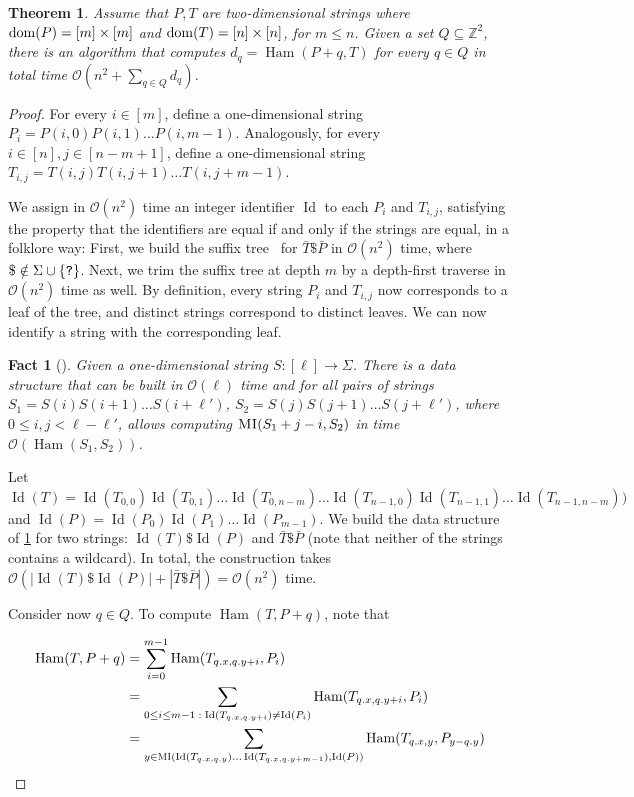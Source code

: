 \documentclass[a4paper,11pt]{article}
\newtheorem{theorem}{Theorem}[section]
\newtheorem{fact}{Fact}[section]
\newcommand{\Z}{\mathbb{Z}}
\renewcommand{\O}{\mathcal{O}}
\DeclareMathOperator*{\Ham}{Ham}
\DeclareMathOperator*{\ID}{Id}
\newcommand{\absolute}[1]{\left\lvert#1\right\rvert}
\begin{document}
\begin{theorem}\label{kangaroos}
Assume that $P, T$ are two-dimensional strings where $\operatorname*{dom}(P) = [m] \times [m]$ and $\operatorname*{dom}(T) = [n] \times [n]$, for $m \le n$. Given a set $Q \subseteq \Z^2$, there is an algorithm that computes $d_q = \Ham(P + q, T) $ for every $q \in Q$ in total time $\O(n^2 + \sum_{q \in Q} d_q)$.
\end{theorem}
\begin{proof}
For every $i \in [m]$, define a one-dimensional string $P_i = P(i,0) P(i,1) \ldots P(i,m-1)$. Analogously, for every $i \in [n], j \in [n-m+1]$, define a one-dimensional string $T_{i,j} = T(i,j) T(i,j+1) \ldots T(i,j+m-1)$. 

We assign in $\O(n^2)$ time an integer identifier $\ID$ to each $P_i$ and $T_{i,j}$, satisfying the property that the identifiers are equal if and only if the strings are equal, in a folklore way: First, we build the suffix tree~\cite{DBLP:conf/focs/Weiner73} for $\bar{T} \$ \bar{P}$ in $\O(n^2)$ time, where $\$ \notin \Sigma \cup \{\texttt{?}\}$. Next, we trim the suffix tree at depth $m$ by a depth-first traverse in $\O(n^2)$ time as well. By definition, every string $P_i$ and $T_{i,j}$ now corresponds to a leaf of the tree, and distinct strings correspond to distinct leaves. We can now identify a string with the corresponding leaf. 

\begin{fact}[{\cite{Galil1986}}]\label{fact:kangaroo1D}
Given a one-dimensional string $S: [\ell] \rightarrow \Sigma$. There is a data structure that can be built in $\O(\ell)$ time and for all pairs of strings $S_1 = S(i) S(i+1) \ldots S(i+\ell')$, $S_2 = S(j) S(j+1) \ldots S(j+\ell')$, where $0 \le i,j < \ell-\ell'$, allows computing $\textnormal{\textsc{MI}}(S_1+j-i, S_2)$ in time $\O(\Ham(S_1,S_2))$. 
\end{fact}

Let $\ID(T) = \ID(T_{0,0}) \ID(T_{0,1}) \ldots \ID(T_{0,n-m}) \ldots \ID(T_{n-1,0}) \ID(T_{n-1,1}) \ldots \ID(T_{n-1,n-m}))$ and $\ID(P) = \ID(P_0)\ID(P_1) \ldots \ID(P_{m-1})$. 
We build the data structure of \cref{fact:kangaroo1D} for two strings: $\ID(T) \$ \ID(P)$ and $\bar{T} \$ \bar{P}$ (note that neither of the strings contains a wildcard). In total, the construction takes $\O(\absolute{\ID(T) \$ \ID(P)} + \absolute{\bar{T} \$ \bar{P}}) = \O(n^2)$ time.

Consider now $q \in Q$. To compute $\Ham(T, P+q)$, note that 

\begin{align*}
\Ham(T, P+q) &= \sum_{i=0}^{m-1} \Ham(T_{\x{q}, \y{q}+i}, P_i)\\
&= \sum_{0 \le i \le m-1 \; : \; \ID(T_{\x{q}, \y{q}+i}) \neq \ID(P_i)} \Ham(T_{\x{q}, \y{q}+i}, P_i) \\
&= \sum_{y \in \MI(\ID(T_{\x{q}, \y{q}}) \ldots \ID(T_{\x{q}, \y{q}+m-1}), \ID(P))} \Ham(T_{\x{q}, y}, P_{y-\y{q}})\\
\end{align*}


\end{proof}
\end{document}
